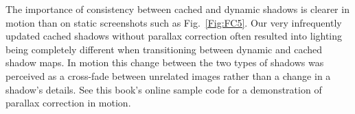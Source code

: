 The importance of consistency between cached and dynamic shadows is clearer 
in motion than on static screenshots such as Fig.~\ref{Fig:FC5}. Our very infrequently
updated cached shadows without parallax correction often resulted into lighting being completely 
different when transitioning between dynamic and cached shadow maps. In motion this change between
the two types of shadows was perceived as a cross-fade between unrelated images 
rather than a change in a shadow's details. See this book's online sample code for a demonstration of
parallax correction in motion.



